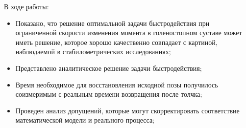 \documentclass[a4paper,12pt, openany]{book}
\theoremstyle{plain} %
\theoremstyle{definition} %
\theoremstyle{remark} %
\numberwithin{equation}{chapter}
\begin{document}
{В ходе работы:
\begin{itemize}
    \item Показано, что решение оптимальной задачи быстродействия при ограниченной
          скорости изменения момента в голеностопном суставе может иметь решение, которое хорошо качественно совпадает с картиной, наблюдаемой в стабилометрических исследованиях;
    \item Представлено аналитическое решение задачи быстродействия;
    \item Время необходимое для восстановления исходной позы получилось
          соизмеримым с реальным времени возвращения после толчка;
    \item Проведен анализ допущений, которые могут скорректировать соответствие математической модели и реального процесса;

\end{itemize}




\newpage


}
\end{document}
